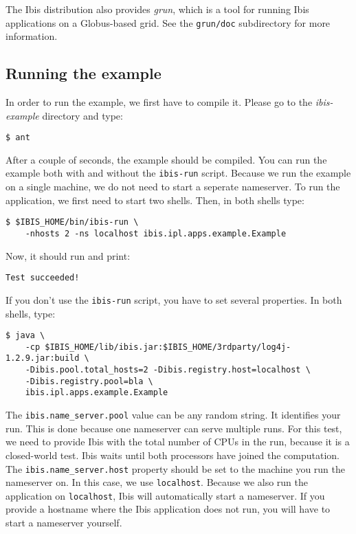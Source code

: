 \documentclass[10pt]{article}
\newcommand{\mysubsection}[1]{\subsection{#1}\label{#1}}
\begin{document}
The Ibis distribution also provides \emph{grun}, which is a tool for
running Ibis applications on a Globus-based grid. See the
\texttt{grun/doc} subdirectory for more information.

\mysubsection{Running the example}
In order to run the example, we first have to compile it.
Please go to the \emph{ibis-example} directory and type:

\noindent
{\small
\begin{verbatim}
$ ant
\end{verbatim}
}
\noindent
After a couple of seconds, the example should be compiled.
You can run the example both with and without the \texttt{ibis-run} script.
Because we run the example on a single machine, we do not need to start a seperate nameserver.
To run the application, we first need to start two shells.
Then, in both shells type:

\noindent
{\small
\begin{verbatim}
$ $IBIS_HOME/bin/ibis-run \
    -nhosts 2 -ns localhost ibis.ipl.apps.example.Example
\end{verbatim}
}
\noindent
Now, it should run and print:

\noindent
{\small
\begin{verbatim}
Test succeeded!
\end{verbatim}
}
\noindent
If you don't use the \texttt{ibis-run} script, you have to set several properties.
In both shells, type:

\noindent
{\small
\begin{verbatim}
$ java \
    -cp $IBIS_HOME/lib/ibis.jar:$IBIS_HOME/3rdparty/log4j-1.2.9.jar:build \
    -Dibis.pool.total_hosts=2 -Dibis.registry.host=localhost \
    -Dibis.registry.pool=bla \
    ibis.ipl.apps.example.Example
\end{verbatim}
}
\noindent
The \texttt{ibis.name\_server.pool} value can be any random string.
It identifies your run.
This is done because one nameserver can serve multiple
runs. For this test, we need to provide Ibis with the total number of
CPUs in the run, because it is a closed-world test. Ibis waits until
both processors have joined the computation.
The \texttt{ibis.name\_server.host} property should
be set to the machine you run the nameserver on.  In this case, we use
\texttt{localhost}.
Because we also run the application on \texttt{localhost}, Ibis will
automatically start a nameserver. If you provide a hostname where the
Ibis application does not run, you will have to start a nameserver
yourself.
\end{document}

